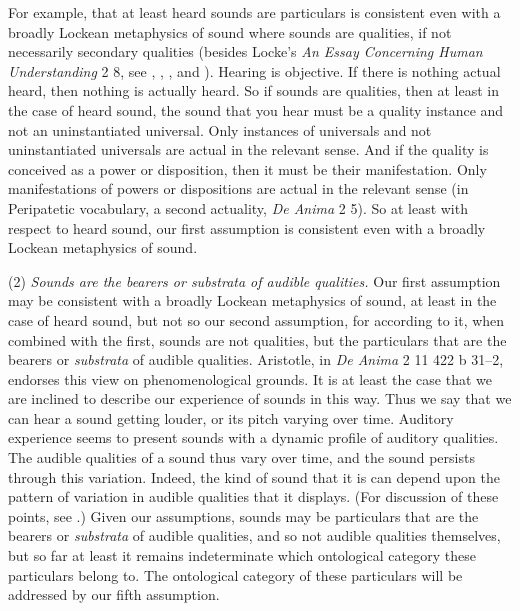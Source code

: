 \documentclass[12pt]{article}
\begin{document}
For example, that at least heard sounds are particulars is consistent even with a broadly Lockean metaphysics of sound where sounds are qualities, if not necessarily secondary qualities (besides Locke's \emph{An Essay Concerning Human Understanding} 2 8, see \citealt{Pasnau:1999ss}, \citealt{Kulvicki:2008aa}, \citealt{Cohen:2010ax}, and \citealt{Roberts:2017as}). Hearing is objective. If there is nothing actual heard, then nothing is actually heard. So if sounds are qualities, then at least in the case of heard sound, the sound that you hear must be a quality instance and not an uninstantiated universal. Only instances of universals and not uninstantiated universals are actual in the relevant sense. And if the quality is conceived as a power or disposition, then it must be their manifestation. Only manifestations of powers or dispositions are actual in the relevant sense (in Peripatetic vocabulary, a second actuality, \emph{De Anima} 2 5). So at least with respect to heard sound, our first assumption is consistent even with a broadly Lockean metaphysics of sound. 

(2) \emph{Sounds are the bearers or \emph{substrata} of audible qualities.} Our first assumption may be consistent with a broadly Lockean metaphysics of sound, at least in the case of heard sound, but not so our second assumption, for according to it, when combined with the first, sounds are not qualities, but the particulars that are the bearers or \emph{substrata} of audible qualities. Aristotle, in \emph{De Anima} 2 11 422 b 31--2, endorses this view on phenomenological grounds. It is at least the case that we are inclined to describe our experience of sounds in this way. Thus we say that we can hear a sound getting louder, or its pitch varying over time. Auditory experience seems to present sounds with a dynamic profile of auditory qualities. The audible qualities of a sound thus vary over time, and the sound persists through this variation. Indeed, the kind of sound that it is can depend upon the pattern of variation in audible qualities that it displays. (For discussion of these points, see \citealt{OCallaghan:2010aa}.) Given our assumptions, sounds may be particulars that are the bearers or \emph{substrata} of audible qualities, and so not audible qualities themselves, but so far at least it remains indeterminate which ontological category these particulars belong to. The ontological category of these particulars will be addressed by our fifth assumption.
\end{document}

